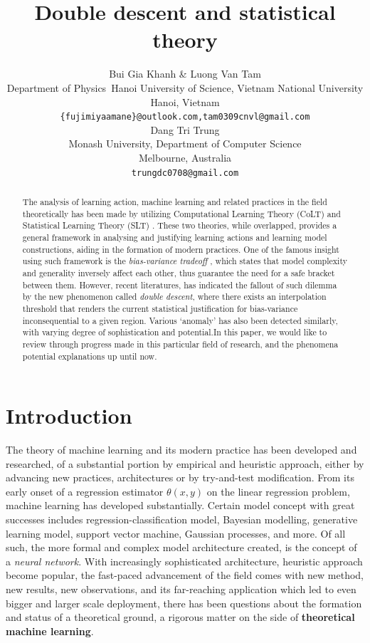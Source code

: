 \documentclass[10pt]{article} %
\title{Double descent and statistical theory}
\author{Bui Gia Khanh  \& Luong Van Tam\\
Department of Physics\
Hanoi University of Science, Vietnam National University\\
Hanoi, Vietnam\\
\texttt{\{fujimiyaamane\}@outlook.com,tam0309cnvl@gmail.com} \\
\AND 
Dang Tri Trung \\
Monash University, Department of Computer Science \\
Melbourne, Australia\\
\texttt{trungdc0708@gmail.com}
}
\begin{document}
\maketitle

\begin{abstract}
       The analysis of learning action, machine learning and related practices in the field theoretically has been made by utilizing Computational Learning Theory (CoLT) \cite{10.1145/1968.1972} and Statistical Learning Theory (SLT) \cite{Vapnik1999-VAPTNO}. These two theories, while overlapped, provides a general framework in analysing and justifying learning actions and learning model constructions, aiding in the formation of modern practices. One of the famous insight using such framework is the \textit{bias-variance tradeoff} \cite{6797087}, which states that model complexity and generality inversely affect each other, thus guarantee the need for a safe bracket between them. However, recent literatures, \cite{belkin_reconciling_2019} has indicated the fallout of such dilemma by the new phenomenon called \textit{double descent}, where there exists an interpolation threshold that renders the current statistical justification for bias-variance inconsequential to a given region. Various `anomaly' has also been detected similarly, with varying degree of sophistication and potential.In this paper, we would like to review through progress made in this particular field of research, and the phenomena potential explanations up until now. 
\end{abstract}

\section{Introduction}

The theory of machine learning and its modern practice has been developed and researched, of a substantial portion by empirical and heuristic approach, either by advancing new practices, architectures or by try-and-test modification. From its early onset of a regression estimator $\theta(x,y)$ on the linear regression problem, machine learning has developed substantially. Certain model concept with great successes includes regression-classification model, Bayesian modelling, generative learning model, support vector machine, Gaussian processes, and more. Of all such, the more formal and complex model architecture created, is the concept of a \textit{neural network}. With increasingly sophisticated architecture, heuristic approach become popular, the fast-paced advancement of the field comes with new method, new results, new observations, and its far-reaching application which led to even bigger and larger scale deployment, there has been questions about the formation and status of a theoretical ground, a rigorous matter on the side of \textbf{theoretical machine learning}.
\end{document}
